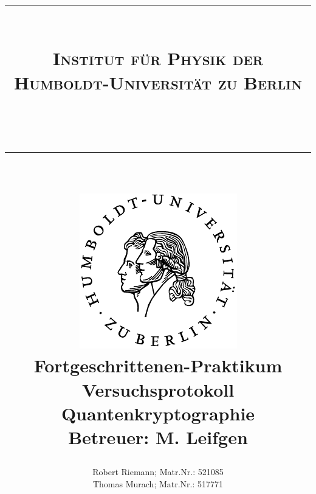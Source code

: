 \documentclass[a4paper,twocolumn,oneside,bibtotoc,smallheadings,tocleft,pointlessnumbers,halfparskip,DIV15]{scrartcl}
\newcommand{\lref}[1]{Listing (\ref{lst:#1})} %
\newcommand{\eref}[1]{Gl. (\ref{eqn:#1})} %
\begin{document}
\title{{\centering \rule{15cm}{0.001cm}\\
\Large{\textsc{Institut für Physik der
Humboldt-Universität zu Berlin}}}\\ \centering \rule{15cm}{0.001cm}\\
\vspace{15mm} \centering
\includegraphics[scale=0.9]{siegel}\\
\vspace{18mm}
{\bf{\huge{Fortgeschrittenen-Praktikum}}}\\
Versuchsprotokoll\\
\vspace{14mm}
Quantenkryptographie\\
\vspace{14mm} {\small{\textbf{Betreuer: M. Leifgen}}}\\}
\author{Robert Riemann; Matr.Nr.: 521085\\
Thomas Murach; Matr.Nr.: 517771\vspace{18mm}}
\vspace{18mm}
\onecolumn
\maketitle
\twocolumn

\tableofcontents
\listoffigures
\listoftables







% 
% 
% 
\end{document}
